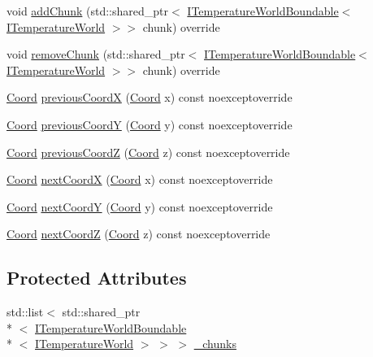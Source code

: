 \begin{DoxyCompactItemize}
\item 
void \hyperlink{class_chunked_temperature_world_a5f9a3a143baf0c0238427926aef77f65}{add\-Chunk} (std\-::shared\-\_\-ptr$<$ \hyperlink{class_i_temperature_world_boundable}{I\-Temperature\-World\-Boundable}$<$ \hyperlink{class_i_temperature_world}{I\-Temperature\-World} $>$$>$ chunk) override
\item 
void \hyperlink{class_chunked_temperature_world_a623c1f5efe7aa84d428ba58365ee775a}{remove\-Chunk} (std\-::shared\-\_\-ptr$<$ \hyperlink{class_i_temperature_world_boundable}{I\-Temperature\-World\-Boundable}$<$ \hyperlink{class_i_temperature_world}{I\-Temperature\-World} $>$$>$ chunk) override
\item 
\hyperlink{struct_coord}{Coord} \hyperlink{class_chunked_temperature_world_a3e547d550f0558039561c18b8c74a329}{previous\-Coord\-X} (\hyperlink{struct_coord}{Coord} x) const noexceptoverride
\item 
\hyperlink{struct_coord}{Coord} \hyperlink{class_chunked_temperature_world_a510495c1304bed5444c53cbe8f30b31a}{previous\-Coord\-Y} (\hyperlink{struct_coord}{Coord} y) const noexceptoverride
\item 
\hyperlink{struct_coord}{Coord} \hyperlink{class_chunked_temperature_world_a0090b0b3cff4b12ffa543ff49ee6ba50}{previous\-Coord\-Z} (\hyperlink{struct_coord}{Coord} z) const noexceptoverride
\item 
\hyperlink{struct_coord}{Coord} \hyperlink{class_chunked_temperature_world_a42c80f4cc05ddf465e1ee08c2ed694f2}{next\-Coord\-X} (\hyperlink{struct_coord}{Coord} x) const noexceptoverride
\item 
\hyperlink{struct_coord}{Coord} \hyperlink{class_chunked_temperature_world_a5370203b68f8e248181a2a5647bfad7f}{next\-Coord\-Y} (\hyperlink{struct_coord}{Coord} y) const noexceptoverride
\item 
\hyperlink{struct_coord}{Coord} \hyperlink{class_chunked_temperature_world_ada9492462c81e605b92b3ac7c2f82f3e}{next\-Coord\-Z} (\hyperlink{struct_coord}{Coord} z) const noexceptoverride
\end{DoxyCompactItemize}
\subsection*{Protected Attributes}
\begin{DoxyCompactItemize}
\item 
std\-::list$<$ std\-::shared\-\_\-ptr\\*
$<$ \hyperlink{class_i_temperature_world_boundable}{I\-Temperature\-World\-Boundable}\\*
$<$ \hyperlink{class_i_temperature_world}{I\-Temperature\-World} $>$ $>$ $>$ \hyperlink{class_chunked_temperature_world_ac1ba488f612261643d130c060eb4611f}{\-\_\-chunks}
\end{DoxyCompactItemize}
